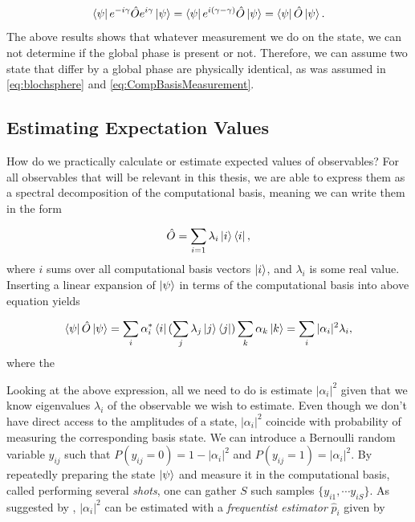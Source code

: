 \begin{equation}\label{eq:ExpectedValue}
    \bra{\psi}e^{-i\gamma}
    \hat{O}e^{i\gamma}\ket{\psi} =\bra{\psi}e^{i(\gamma-\gamma) }\hat{O}\ket{\psi} = 
    \bra{\psi}\hat{O}\ket{\psi}.
\end{equation}
The above results shows that whatever measurement we do on the state, we can not determine if the global phase is present or not. Therefore, we can assume two state that differ by a global phase are physically identical, as was assumed in \autoref{eq:blochsphere} and \autoref{eq:CompBasisMeasurement}.

\subsection{Estimating Expectation Values}\label{sec:EstimatingExpectationValues}

How do we practically calculate or estimate expected values of observables? For all observables that will be relevant in this thesis, we are able to express them as a spectral decomposition of the computational basis, meaning we can write them in the form 

\begin{equation}\label{eq:ExpectedValue}
    \hat{O} = \sum_{i=1} \lambda_i\ket{i}\bra{i},
\end{equation}
where $i$ sums over all computational basis vectors $\ket{i}$, and $\lambda_i$ is some real value. Inserting a linear expansion of $\ket{\psi}$ in terms of the computational basis into above equation yields

\begin{equation}\label{eq:ExpectedValueExact}
    \bra{\psi}\hat{O}\ket{\psi} = \sum_{i} \alpha_i^*\bra{i}(\sum_{j} \lambda_j\ket{j}\bra{j})\sum_{k} \alpha_k\ket{k} = \sum_{i} |\alpha_i|^2\lambda_i,
\end{equation}
where the 

Looking at the above expression, all we need to do is estimate $|\alpha_i|^2$ given that we know eigenvalues $\lambda_i$ of the observable we wish to estimate. Even though we don't have direct access to the amplitudes of a state, $|\alpha_i|^2$ coincide with probability of measuring the corresponding basis state. We can introduce a Bernoulli random variable $y_{ij}$ such that $P(y_{ij} = 0) = 1-|\alpha_i|^2$ and $P(y_{ij} = 1) = |\alpha_i|^2$. By repeatedly preparing the state $\ket{\psi}$ and measure it in the computational basis, called performing several \emph{shots}, one can gather $S$ such samples $\{y_{i1}, \cdots y_{iS}\}$. As suggested by \cite{SupervisedwquantumComputers}, $|\alpha_i|^2$ can be estimated with a \emph{frequentist estimator} $\hat{p}_i$ given by

